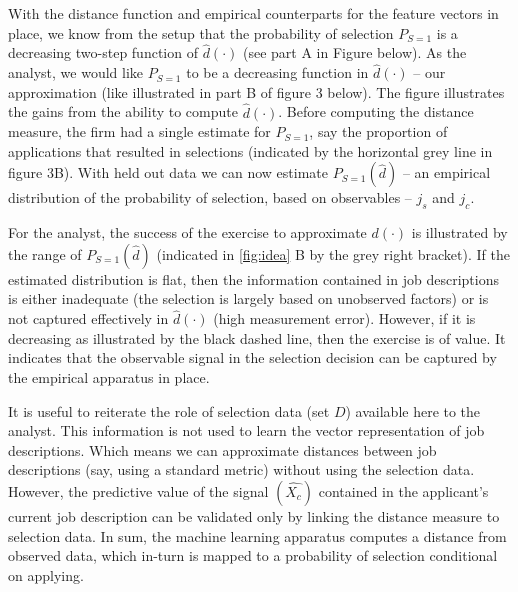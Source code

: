 \documentclass{article}
\begin{document}
With the distance function and empirical counterparts for the feature vectors in place, we know from the setup that the probability of selection \(P_{S=1}\) is a decreasing two-step function of \(\hat{d}(\cdot)\) (see part A in Figure below). As the analyst, we would like \(P_{S=1}\) to be a decreasing function in \(\hat{d}(\cdot)\) -- our approximation (like illustrated in part B of figure 3 below). The figure illustrates the gains from the ability to compute \(\hat{d}(\cdot)\). Before computing the distance measure, the firm had a single estimate for \(P_{S=1}\), say the proportion of applications that resulted in selections (indicated by the horizontal grey line in figure 3B). With held out data we can now estimate \(P_{S=1}(\hat{d})\) -- an empirical distribution of the probability of selection, based on observables -- \(j_s\) and \(j_c\).


For the analyst, the success of the exercise to approximate \(d(\cdot)\) is illustrated by the range of \(P_{S=1}(\hat{d})\) (indicated in \autoref{fig:idea} B by the grey right bracket). If the estimated distribution is flat, then the information contained in job descriptions is either inadequate (the selection is largely based on unobserved factors) or is not captured effectively in \(\hat{d}(\cdot)\) (high measurement error). However, if it is decreasing as illustrated by the black dashed line, then the exercise is of value. It indicates that the observable signal in the selection decision can be captured by the empirical apparatus in place.







It is useful to reiterate the role of selection data (set $D$) available here to the analyst. This information is not used to learn the vector representation of job descriptions. Which means we can approximate distances between job descriptions (say, using a standard metric) without using the selection data. However, the predictive value of the signal $(\hat{X_c})$ contained in the applicant’s current job description can be validated only by linking the distance measure to selection data. In sum, the machine learning apparatus computes a distance from observed data, which in-turn is mapped to a probability of selection conditional on applying.
\end{document}
